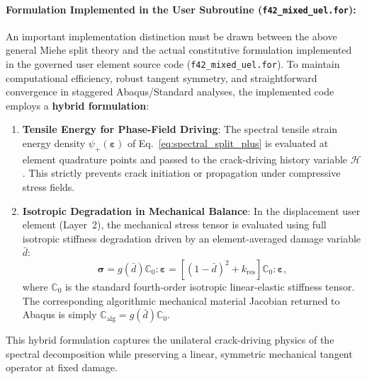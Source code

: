 \paragraph{Formulation Implemented in the User Subroutine (\nolinkurl{f42_mixed_uel.for}):}
An important implementation distinction must be drawn between the above general Miehe split theory and the actual constitutive formulation implemented in the governed user element source code (\nolinkurl{f42_mixed_uel.for}). To maintain computational efficiency, robust tangent symmetry, and straightforward convergence in staggered Abaqus/Standard analyses, the implemented code employs a \textbf{hybrid formulation}:
\begin{enumerate}
    \item \textbf{Tensile Energy for Phase-Field Driving}: The spectral tensile strain energy density $\psi_+(\boldsymbol{\varepsilon})$ of Eq.~\eqref{eq:spectral_split_plus} is evaluated at element quadrature points and passed to the crack-driving history variable $\mathcal{H}$. This strictly prevents crack initiation or propagation under compressive stress fields.
    \item \textbf{Isotropic Degradation in Mechanical Balance}: In the displacement user element (Layer~2), the mechanical stress tensor is evaluated using full isotropic stiffness degradation driven by an element-averaged damage variable $\bar{d}$:
    \begin{equation}
    \label{eq:cauchy_stress_implemented}
    \boldsymbol{\sigma} = g(\bar{d}) \mathbb{C}_0 : \boldsymbol{\varepsilon} = \left[ (1 - \bar{d})^2 + k_{\mathrm{res}} \right] \mathbb{C}_0 : \boldsymbol{\varepsilon},
    \end{equation}
    where $\mathbb{C}_0$ is the standard fourth-order isotropic linear-elastic stiffness tensor. The corresponding algorithmic mechanical material Jacobian returned to Abaqus is simply $\mathbb{C}_{\mathrm{alg}} = g(\bar{d})\mathbb{C}_0$.
\end{enumerate}
This hybrid formulation captures the unilateral crack-driving physics of the spectral decomposition while preserving a linear, symmetric mechanical tangent operator at fixed damage.

